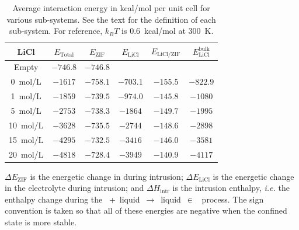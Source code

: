 \documentclass[thesis]{subfiles}
\begin{document}
\begin{table}[ht]
    \caption{Average interaction energy in kcal/mol per unit cell for various
    sub-systems. See the text for the definition of each sub-system.
    For reference, $k_BT$ is \SI{0.6}{kcal/mol} at \SI{300}{K}.}
    \label{table:thermo:raw}
    \centering
    \renewcommand{\arraystretch}{1.3}
    \begin{tabular}{c c c c c c}
        \toprule
        \bf LiCl       & $E_\text{Total}$ & $E_\text{ZIF}$ & $E_\text{LiCl}$ & $E_\text{LiCl/ZIF}$ & $E_\text{LiCl}^\text{bulk}$ \\
        \midrule
        Empty          &     $-746.8$       &    $-746.8$      &                 &                      &             \\
        \SI{0}{mol/L}  &     $-1617$        &    $-758.1$      &   $-703.1$        &     $-155.5$           &   $-822.9$    \\
        \SI{1}{mol/L}  &     $-1859$        &    $-739.5$      &   $-974.0$        &     $-145.8$          &   $-1080$     \\
        \SI{5}{mol/L}  &     $-2753$        &    $-738.3$      &   $-1864$         &     $-149.7$           &   $-1995$     \\
        \SI{10}{mol/L} &     $-3628$        &    $-735.5$      &   $-2744$         &     $-148.6$           &   $-2898$     \\
        \SI{15}{mol/L} &     $-4295$        &    $-732.5$      &   $-3416$         &     $-146.0$           &   $-3581$     \\
        \SI{20}{mol/L} &     $-4818$        &    $-728.4$      &   $-3949$         &     $-140.9$           &   $-4117$     \\
        \bottomrule
    \end{tabular}
\end{table}

$\Delta E_\text{ZIF}$ is the energetic change in  during intrusion; $\Delta
E_\text{LiCl}$ is the energetic change in the electrolyte during intrusion; and
$\Delta H_\text{intr}$ is the intrusion enthalpy, \emph{i.e.} the enthalpy
change during the \mbox{ + liquid $\rightarrow$ liquid $\in$
} process. The sign convention is taken so that all of these energies are
negative when the confined state is more stable.
\end{document}

